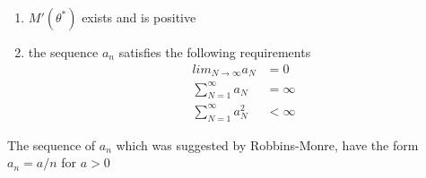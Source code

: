 \documentclass[12pt, a4paper]{article}
\begin{document}
\begin{itemize}
\begin{enumerate}
            \item $M'(\theta^*)$ exists and is positive
            \item the sequence $a_n$ satisfies the following requirements
            \begin{align*}
                lim_{N\rightarrow\infty} a_N &=0\\
                \sum_{N=1}^\infty a_N &=\infty\\
                \sum_{N=1}^\infty a_N^2 &<\infty
            \end{align*}
        \end{enumerate}
        The sequence of $a_n$ which was suggested by Robbins-Monre, have the form $a_n=a/n$ for 
        $a>0$
    \end{itemize}
\end{document}
